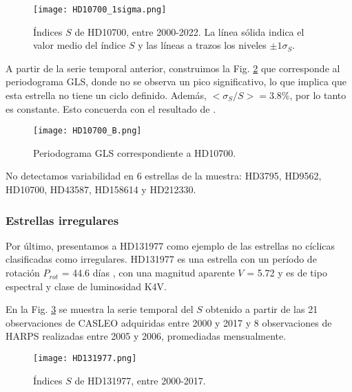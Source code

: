 \documentclass[baaa]{baaa}
\begin{document}
\begin{figure}[ht!]
\centering
\texttt{[image: HD10700\_1sigma.png]}
\caption{Índices $S$ de HD10700, entre 2000-2022. 
La línea sólida indica el valor medio del índice $S$ y las líneas a trazos los niveles $\pm1\sigma_S$.}
\label{hd10700ST}
\end{figure}

A partir de la serie temporal anterior, construimos la Fig. \ref{hd10700P} que corresponde al periodograma GLS, donde no se observa un pico significativo, lo que implica que esta estrella no tiene un ciclo definido. Además, $<\sigma_S/S>=3.8\%$, por lo tanto es constante. Esto concuerda con el resultado de \cite{Baum22}. 

\begin{figure}[ht!]
\centering
\texttt{[image: HD10700\_B.png]}
\caption{Periodograma GLS correspondiente a HD10700.}
\label{hd10700P}
\end{figure}

No detectamos variabilidad en 6 estrellas de la muestra: HD3795, HD9562, HD10700, HD43587, HD158614 y HD212330. 
 
\subsubsection{Estrellas irregulares}

Por último, presentamos a HD131977 como ejemplo de las estrellas no cíclicas clasificadas como irregulares. HD131977 es una estrella con un período de rotación $P_{rot}$ = 44.6 días \citep{Cincunegui07}, con una magnitud aparente $V$ = 5.72 y es de tipo espectral y clase de luminosidad K4V. 


En la Fig. \ref{hd131977ST} se muestra la serie temporal del $S$ obtenido a partir de las 21 observaciones de CASLEO adquiridas entre 2000 y 2017 y 8 observaciones de HARPS realizadas entre 2005 y 2006, promediadas mensualmente.


\begin{figure}[ht!]
\centering
\texttt{[image: HD131977.png]}
\caption{Índices $S$ de HD131977, entre 2000-2017.
}
\label{hd131977ST}
\end{figure}
\end{document}
